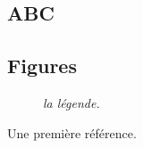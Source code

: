 \documentclass[12pt,twoside]{article}
\begin{document}
\subsection{ABC}

\subsection{Figures} \label{sec:figures}

\begin{figure}
\caption{\em
 la l\'egende.
 \label{fig:Plot}
}
\end{figure}
\begin{thebibliography}{99}
 Une premi\`ere r\'ef\'erence.
 \end{thebibliography}
\end{document}
